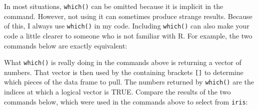 \documentclass[
  13,
  letterpaper,
]{report}
\newenvironment{Shaded}{\begin{snugshade}}{\end{snugshade}}
\newcommand{\CommentTok}[1]{\textcolor[rgb]{0.37,0.37,0.37}{#1}}
\newcommand{\FunctionTok}[1]{\textcolor[rgb]{0.28,0.35,0.67}{#1}}
\newcommand{\NormalTok}[1]{\textcolor[rgb]{0.00,0.23,0.31}{#1}}
\newcommand{\OtherTok}[1]{\textcolor[rgb]{0.00,0.23,0.31}{#1}}
\newcommand{\SpecialCharTok}[1]{\textcolor[rgb]{0.37,0.37,0.37}{#1}}
\newcommand{\StringTok}[1]{\textcolor[rgb]{0.13,0.47,0.30}{#1}}
\begin{document}
\begin{Shaded}
\end{Shaded}

In most situations, \texttt{which()} can be omitted because it is
implicit in the command. However, not using it can sometimes produce
strange results. Because of this, I always use \texttt{which()} in my
code. Including \texttt{which()} can also make your code a little
clearer to someone who is not familiar with R. For example, the two
commands below are exactly equivalent:

\begin{Shaded}
\end{Shaded}

What \texttt{which()} is really doing in the commands above is returning
a vector of numbers. That vector is then used by the containing brackets
\texttt{{[}{]}} to determine which pieces of the data frame to pull. The
numbers returned by \texttt{which()} are the indices at which a logical
vector is TRUE. Compare the results of the two commands below, which
were used in the commands above to select from \texttt{iris}:
\end{document}
